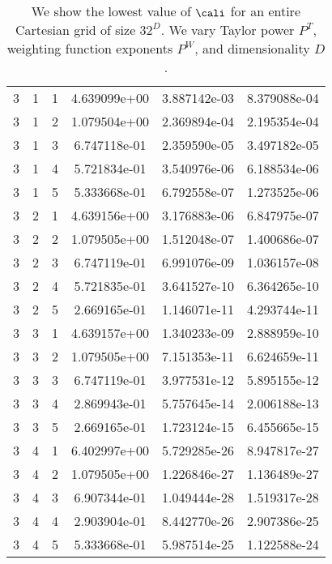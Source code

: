 \documentclass{article}
\begin{document}
{\begin{small}
\begin{table}
\begin{center}
\begin{tabular}{|ccc|ccc|}
\hline
3 & 1 & 1 &  4.639099e+00 & 3.887142e-03 & 8.379088e-04 \\ 
3 & 1 & 2 &  1.079504e+00 & 2.369894e-04 & 2.195354e-04 \\ 
3 & 1 & 3 &  6.747118e-01 & 2.359590e-05 & 3.497182e-05 \\ 
3 & 1 & 4 &  5.721834e-01 & 3.540976e-06 & 6.188534e-06 \\ 
3 & 1 & 5 &  5.333668e-01 & 6.792558e-07 & 1.273525e-06 \\ 
3 & 2 & 1 &  4.639156e+00 & 3.176883e-06 & 6.847975e-07 \\ 
3 & 2 & 2 &  1.079505e+00 & 1.512048e-07 & 1.400686e-07 \\ 
3 & 2 & 3 &  6.747119e-01 & 6.991076e-09 & 1.036157e-08 \\ 
3 & 2 & 4 &  5.721835e-01 & 3.641527e-10 & 6.364265e-10 \\ 
3 & 2 & 5 &  2.669165e-01 & 1.146071e-11 & 4.293744e-11 \\ 
3 & 3 & 1 &  4.639157e+00 & 1.340233e-09 & 2.888959e-10 \\ 
3 & 3 & 2 &  1.079505e+00 & 7.151353e-11 & 6.624659e-11 \\ 
3 & 3 & 3 &  6.747119e-01 & 3.977531e-12 & 5.895155e-12 \\ 
3 & 3 & 4 &  2.869943e-01 & 5.757645e-14 & 2.006188e-13 \\ 
3 & 3 & 5 &  2.669165e-01 & 1.723124e-15 & 6.455665e-15 \\ 
3 & 4 & 1 &  6.402997e+00 & 5.729285e-26 & 8.947817e-27 \\ 
3 & 4 & 2 &  1.079505e+00 & 1.226846e-27 & 1.136489e-27 \\ 
3 & 4 & 3 &  6.907344e-01 & 1.049444e-28 & 1.519317e-28 \\ 
3 & 4 & 4 &  2.903904e-01 & 8.442770e-26 & 2.907386e-25 \\ 
3 & 4 & 5 &  5.333668e-01 & 5.987514e-25 & 1.122588e-24 \\ 
\hline
\end{tabular}
\end{center}
\label{fig::allRegSolvability}
\caption
    {
      We show the lowest value of
      $\cali$ for an entire Cartesian grid of size $32^D$.
      We vary Taylor power $P^T$, weighting
      function exponents $P^W$, and dimensionality $D$. 
    }
\end{table}
\end{small}


}
\end{document}
